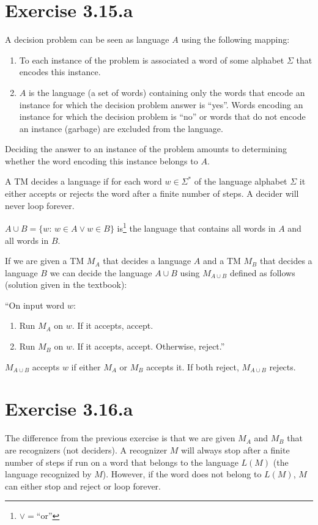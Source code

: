 \documentclass{article}
\newcommand{\0}{\texttt{\textvisiblespace}}
\newcommand{\°}{\obullet{\0}}
\newcommand{\st}{\colon\,}
\newcommand{\TM}{TM}
\begin{document}
\section{Exercise 3.15.a}
A decision problem can be seen as language \(A\) using the following mapping:
\begin{enumerate}
	\item To each instance of the problem is associated a word of some alphabet
		\(\Sigma\) that encodes this instance.
	\item \(A\) is the language (a set of words) containing only
		the words that encode an instance for
		which the decision problem answer is ``yes''. Words encoding an
		instance for which the decision problem is ``no'' or words that do not
		encode an instance (garbage) are excluded from the language.
\end{enumerate}
Deciding the answer to an instance of the problem amounts to determining
whether the word encoding this instance belongs to \(A\).

A \TM{} decides a language if for each word \(w \in \Sigma^{*}\)
of the language alphabet \(\Sigma\)
it either accepts or rejects the word after a finite number of steps. A decider
will never loop forever.

\(A \cup B = \{w \st w \in A \lor w \in B\}\)
is\footnote{\(\lor = \text{``or''}\)}
the language that contains all words in \(A\) and all words in \(B\).

If we are given a \TM{} \(M_A\) that decides a language \(A\) and
a \TM{} \(M_B\) that decides a language \(B\) we can decide the
language \(A \cup B\) using \(M_{A \cup B}\) defined as follows
(solution given in the textbook):

``On input word \(w\):
\begin{enumerate}
	\item Run \(M_A\) on \(w\). If it accepts, accept.
	\item Run \(M_B\) on \(w\). If it accepts, accept. Otherwise, reject.''
\end{enumerate}
\(M_{A \cup B}\) accepts \(w\) if either \(M_A\) or \(M_B\) accepts it.
If both reject, \(M_{A \cup B}\) rejects.

\section{Exercise 3.16.a}

The difference from the previous exercise is that we are given \(M_A\) and
\(M_B\) that are recognizers (not deciders). A recognizer \(M\) will always stop
after a finite number of steps if run on a word that belongs to the language
\(L(M)\) (the language recognized by \(M\)).
However, if the word does not belong to \(L(M)\), \(M\) can either stop and reject or loop forever.
\end{document}
